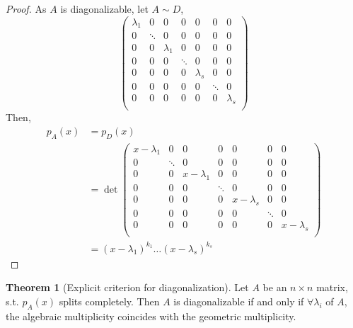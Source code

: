 \documentclass[fleqn, a4paper, 12pt]{article}
\theoremstyle{definition}
\theoremstyle{theorem}
\newtheorem{theorem}{Theorem} %
\theoremstyle{remark}
\numberwithin{corollary}{theorem}
\numberwithin{equation}{theorem}
\begin{document}
\begin{proof}
	As $A$ is diagonalizable, let $A \sim D$, 
	\begin{equation*}
		\begin{pmatrix}
			\lambda_1 & 0 & 0 & 0 & 0 & 0 & 0\\
			0 & \ddots & 0 & 0 & 0 & 0 & 0\\
			0 & 0 & \lambda_1 & 0 & 0 & 0 & 0\\
			0 & 0 & 0 & \ddots & 0 & 0 & 0 \\
			0 & 0 & 0 & 0 & \lambda_s & 0 & 0\\		
			0 & 0 & 0 & 0 & 0 & \ddots & 0\\
			0 & 0 & 0 & 0 & 0 & 0 & \lambda_s\\			
		\end{pmatrix}
	\end{equation*}
	Then, 
	\begin{align*}
		p_A (x) &= p_D (x)\\
		&= \det 
			\begin{pmatrix}
				x - \lambda_1 & 0 & 0 & 0 & 0 & 0 & 0\\
				0 & \ddots & 0 & 0 & 0 & 0 & 0\\
				0 & 0 & x - \lambda_1 & 0 & 0 & 0 & 0\\
				0 & 0 & 0 & \ddots & 0 & 0 & 0 \\
				0 & 0 & 0 & 0 & x - \lambda_s & 0 & 0\\		
				0 & 0 & 0 & 0 & 0 & \ddots & 0\\
				0 & 0 & 0 & 0 & 0 & 0 & x - \lambda_s\\	
			\end{pmatrix}\\
		&= (x - \lambda_1)^{k_1} \dots (x - \lambda_s)^{k_s}
	\end{align*}
\end{proof}

\begin{theorem}[Explicit criterion for diagonalization]
	Let $A$ be an $n \times n$ matrix, s.t. $p_A (x)$ splits completely. Then $A$ is diagonalizable if and only if $\forall \lambda_i$ of $A$, the algebraic multiplicity coincides with the geometric multiplicity.
\end{theorem}
\end{document}
